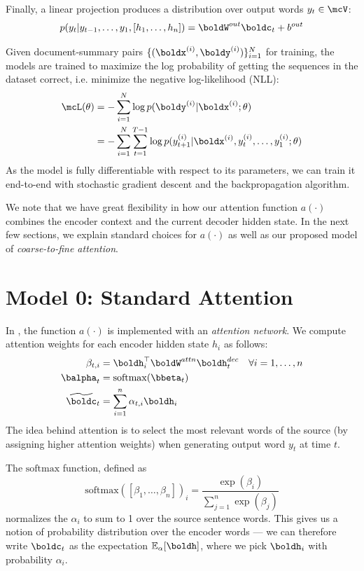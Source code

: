 \documentclass[12pt]{report}
\begin{document}
Finally, a linear projection produces a distribution over output words $y_t \in \mcV$:
\begin{equation}
p(y_t | y_{t-1}, \ldots, y_1, [h_1, \ldots, h_n]) = \boldW^{out}\boldc_t + b^{out}
\end{equation}

Given document-summary pairs $\{ (\boldx^{(i)}, \boldy^{(i)}) \}_{i=1}^N$ for training, the models are trained to maximize the log probability of getting the sequences in the dataset correct, i.e. minimize the negative log-likelihood (NLL):
\begin{align*}
\mcL(\theta) &= - \sum_{i=1}^N \log p(\boldy^{(i)} | \boldx^{(i)}; \theta)  \\
&= -\sum_{i=1}^N \sum_{t=1}^{T-1} \log p(y_{t+1}^{(i)} | \boldx^{(i)}, y_t^{(i)}, \ldots, y_1^{(i)} ; \theta)
\end{align*}
As the model is fully differentiable with respect to its parameters, we can train it end-to-end with stochastic gradient descent and the backpropagation algorithm.

We note that we have great flexibility in how our attention function $a(\cdot)$ combines the encoder context and the current decoder hidden state. In the next few sections, we explain standard choices for $a(\cdot)$ as well as our proposed model of \emph{coarse-to-fine attention}.

\section{Model 0: Standard Attention}

In \citet{bahdanau2014neural}, the function $a(\cdot)$ is implemented with an \emph{attention network}. We compute attention weights for each encoder hidden state $h_i$ as follows:
\begin{align}
\beta_{t,i} &= \boldh_i^\top \boldW^{attn} \boldh_t^{dec} \quad \forall i = 1, \ldots, n\\
\balpha_t &= \mathrm{softmax}(\bbeta_t) \\
\widetilde{\boldc}_t &= \sum_{i=1}^n \alpha_{t,i} \boldh_i
\end{align}
The idea behind attention is to select the most relevant words of the source (by assigning higher attention weights) when generating output word $y_t$ at time $t$.

The $\mathrm{softmax}$ function, defined as
\begin{equation}
\mathrm{softmax}([\beta_1, \ldots, \beta_n])_i =  \frac{\exp(\beta_i)}{\sum_{j=1}^n \exp(\beta_j)}
\end{equation}
normalizes the $\alpha_i$ to sum to 1 over the source sentence words. This gives us a notion of probability distribution over the encoder words --- we can therefore write $\boldc_t$ as the expectation $\mathbb{E}_\alpha[\boldh]$, where we pick $\boldh_i$ with probability $\alpha_i$.
\end{document}
